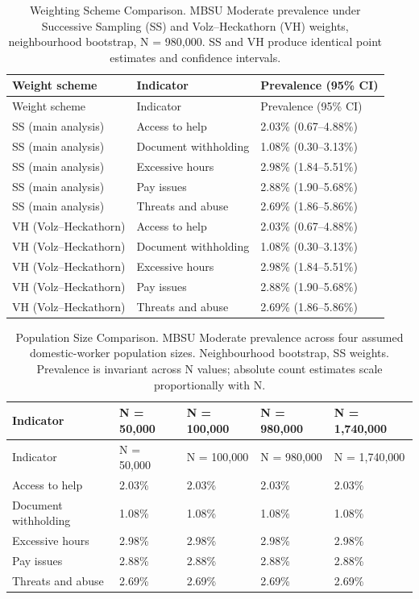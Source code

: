 \documentclass[
  12pt,
  letterpaper,
  DIV=11,
  numbers=noendperiod]{scrreprt}
\begin{document}
\begin{longtable}[]{@{}lll@{}}
\caption{Weighting Scheme Comparison. MBSU Moderate prevalence under
Successive Sampling (SS) and Volz--Heckathorn (VH) weights,
neighbourhood bootstrap, N = 980,000. SS and VH produce identical point
estimates and confidence intervals.}\label{tbl-weighting}\tabularnewline
\toprule\noalign{}
Weight scheme & Indicator & Prevalence (95\% CI) \\
\midrule\noalign{}
\endfirsthead
\toprule\noalign{}
Weight scheme & Indicator & Prevalence (95\% CI) \\
\midrule\noalign{}
\endhead
\bottomrule\noalign{}
\endlastfoot
SS (main analysis) & Access to help & 2.03\% (0.67--4.88\%) \\
SS (main analysis) & Document withholding & 1.08\% (0.30--3.13\%) \\
SS (main analysis) & Excessive hours & 2.98\% (1.84--5.51\%) \\
SS (main analysis) & Pay issues & 2.88\% (1.90--5.68\%) \\
SS (main analysis) & Threats and abuse & 2.69\% (1.86--5.86\%) \\
VH (Volz--Heckathorn) & Access to help & 2.03\% (0.67--4.88\%) \\
VH (Volz--Heckathorn) & Document withholding & 1.08\% (0.30--3.13\%) \\
VH (Volz--Heckathorn) & Excessive hours & 2.98\% (1.84--5.51\%) \\
VH (Volz--Heckathorn) & Pay issues & 2.88\% (1.90--5.68\%) \\
VH (Volz--Heckathorn) & Threats and abuse & 2.69\% (1.86--5.86\%) \\
\end{longtable}

\begin{longtable}[]{@{}lllll@{}}
\caption{Population Size Comparison. MBSU Moderate prevalence across
four assumed domestic-worker population sizes. Neighbourhood bootstrap,
SS weights. Prevalence is invariant across N values; absolute count
estimates scale proportionally with
N.}\label{tbl-popsize}\tabularnewline
\toprule\noalign{}
Indicator & N = 50,000 & N = 100,000 & N = 980,000 & N = 1,740,000 \\
\midrule\noalign{}
\endfirsthead
\toprule\noalign{}
Indicator & N = 50,000 & N = 100,000 & N = 980,000 & N = 1,740,000 \\
\midrule\noalign{}
\endhead
\bottomrule\noalign{}
\endlastfoot
Access to help & 2.03\% & 2.03\% & 2.03\% & 2.03\% \\
Document withholding & 1.08\% & 1.08\% & 1.08\% & 1.08\% \\
Excessive hours & 2.98\% & 2.98\% & 2.98\% & 2.98\% \\
Pay issues & 2.88\% & 2.88\% & 2.88\% & 2.88\% \\
Threats and abuse & 2.69\% & 2.69\% & 2.69\% & 2.69\% \\
\end{longtable}
\end{document}
